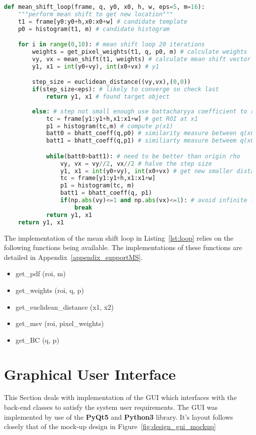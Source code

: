 \begin{lstlisting}[language=Python, caption={Mean shift loop}, captionpos=b, label={lst:loop}]
def mean_shift_loop(frame, q, y0, x0, h, w, eps=5, m=16):
    """perform mean shift to get new location"""
    t1 = frame[y0:y0+h,x0:x0+w] # candidate template
    p0 = histogram(t1, m) # candidate histogram

    for i in range(0,10): # mean shift loop 20 iterations
        weights = get_pixel_weights(t1, q, p0, m) # calculate weights
        vy, vx = mean_shift(t1, weights) # calculate mean shift vector
        y1, x1 = int(y0+vy), int(x0+vx) # y1

        step_size = euclidean_distance((vy,vx),(0,0))
        if(step_size<eps): # likely to converge so check last
            return y1, x1 # found target object
            
        else: # step not small enough use battacharyya coefficient to refine step
            tc = frame[y1:y1+h,x1:x1+w] # get ROI at x1
            p1 = histogram(tc,m) # compute p(x1)
            batt0 = bhatt_coeff(q,p0) # similarity measure between q(x0) and p(x0) 
            batt1 = bhatt_coeff(q,p1) # similiarty measure betweem q(x0) and p(x1)

            while(batt0>batt1): # need to be better than origin rho
                vy, vx = vy//2, vx//2 # halve the step size
                y1, x1 = int(y0+vy), int(x0+vx) # get new smaller distance 
                tc = frame[y1:y1+h,x1:x1+w]
                p1 = histogram(tc, m)
                batt1 = bhatt_coeff(q, p1)
                if(np.abs(vy)<=1 and np.abs(vx)<=1): # avoid infinite loop
                    break
            return y1, x1
    return y1, x1
\end{lstlisting}

The implementation of the mean shift loop in Listing~\ref{lst:loop} relies on
the following functions being available. The implementations of these functions
are detailed in Appendix~\ref{appendix_supportMS}.
\begin{itemize}
    \item get\_pdf (roi, m)
    \item get\_weights (roi, q, p)
    \item get\_euclidean\_distance (x1, x2)
    \item get\_msv (roi, pixel\_weights)
    \item get\_BC (q, p)
\end{itemize}

\section{Graphical User Interface}
This Section deals with implementation of the GUI which interfaces with the
back-end classes to satisfy the system user requirements.  The GUI was
implemented by use of the \textbf{PyQt5} and \textbf{Python3} library. It's
layout follows closely that of the mock-up design in
Figure~\ref{fig:design_gui_mockup}

